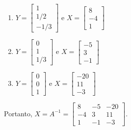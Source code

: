 \documentclass[12pt,a4paper]{article}
\begin{document}
\begin{ExerciseList}
\begin{multicols}{3}
\begin{footnotesize}
\begin{enumerate}
\item
$
Y = \begin{bmatrix}
1 \\ 1/2 \\ -1/3
\end{bmatrix}
\text{ e }
X = \begin{bmatrix}
8 \\ -4 \\ 1
\end{bmatrix}
$
\item
$
Y  =
\begin{bmatrix}
0 \\ 1 \\ 1/3
\end{bmatrix}
\text{ e }
 X  =
\begin{bmatrix}
-5 \\ 3 \\ -1
\end{bmatrix}$
\item
$
Y  =
\begin{bmatrix}
0 \\ 0 \\ 1
\end{bmatrix}
\text{ e }
 X  =
\begin{bmatrix}
-20 \\ 11 \\-3
\end{bmatrix}$
\end{enumerate}
\end{footnotesize}
\end{multicols}
Portanto, $X = A^{-1} = 
\begin{bmatrix}
 8 & -5 & -20\\
-4 &  3 &  11\\
 1 & -1 &  -3
\end{bmatrix}$.



\end{ExerciseList}
\end{document}
